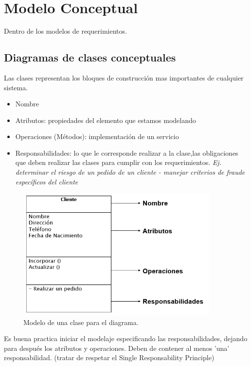 \documentclass[titlepage,a4paper]{article}
\begin{document}
\section{Modelo Conceptual}
Dentro de los modelos de requerimientos.

\subsection{Diagramas de clases conceptuales}
Las clases representan los bloques de construcción mas importantes de cualquier sistema.

\begin{itemize}
    \item Nombre
    \item Atributos: propiedades del elemento que estamos modelando
    \item Operaciones (Métodos): implementación de un servicio
    \item Responsabilidades: lo que le corresponde realizar a la clase,las obligaciones que deben realizar las clases para cumplir con los requerimientos. \textit{Ej. determinar el riesgo de un pedido de un cliente - manejar criterios de fraude específicos del cliente}
\end{itemize}

\begin{figure}[!htb]
    \centering
    \includegraphics[width=0.9\textwidth]{Imagenes/Clase.png}
    \caption{Modelo de una clase para el diagrama.}
\end{figure}

Es buena practica iniciar el modelaje especificando las responsabilidades, dejando para después los atributos y operaciones. Deben de contener al menos 'una' responsabilidad. (tratar de respetar el Single Responsability Principle)
\end{document}
